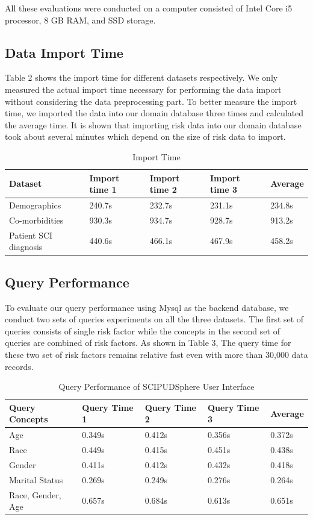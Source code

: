 \documentclass{amia}
\begin{document}
All these evaluations were conducted on a computer consisted of Intel Core i5 processor, 8 GB RAM, and SSD storage.

\subsection{Data Import Time}

Table 2 shows the import time for different datasets respectively. We only measured the actual import time necessary for performing the data import without considering the data preprocessing part. To better measure the import time, we imported the data into our domain database three times and calculated the average time. It is shown that importing risk data into our domain database took about several minutes which depend on the size of risk data to import.

\begin{table}[!ht]
\centering
  \begin{tabular}{|l|l|l|l|l|}
  \hline
    \textbf{Dataset}  & \textbf{Import time 1} & \textbf{Import time 2} & \textbf{Import time 3} & \textbf{Average} \\ \hline
    Demographics & 240.7s & 232.7s & 231.1s & 234.8s  \\ \hline
    Co-morbidities  & 930.3s & 934.7s & 928.7s & 913.2s  \\ \hline
    Patient SCI diagnosis  & 440.6s & 466.1s & 467.9s & 458.2s \\ \hline
  \end{tabular}
  \caption{Import Time}
\end{table}

\subsection{Query Performance}
To evaluate our query performance using Mysql as the backend database, we conduct two sets of queries experiments on all the three datasets. The first set of queries consists of single risk factor while the concepts in the second set of queries are combined of risk factors. As shown in Table 3, The query time for these two set of risk factors remains relative fast even with more than 30,000 data records. 

\begin{table}[!ht]
\centering
  \begin{tabular}{|l|l|l|l|l|}
  \hline
    \textbf{Query Concepts}  & \textbf{Query Time 1} & \textbf{Query Time 2} & \textbf{Query Time 3} & \textbf{Average} \\ \hline
    Age & 0.349s & 0.412s & 0.356s & 0.372s \\ \hline
    Race & 0.449s & 0.415s & 0.451s & 0.438s \\ \hline
    Gender   & 0.411s & 0.412s & 0.432s & 0.418s \\ \hline
    Marital Status   & 0.269s & 0.249s & 0.276s & 0.264s \\ \hline
    Race, Gender, Age & 0.657s & 0.684s & 0.613s & 0.651s \\ \hline
  \end{tabular}
  \caption{Query Performance of SCIPUDSphere User Interface}
\end{table}
\end{document}
